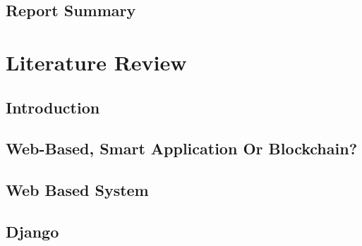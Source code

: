 \documentclass[a4paper,12pt]{book}
\begin{document}
	\section{Report Summary}
		

\chapter{Literature Review}
	\section{Introduction}
		
	\section{Web-Based, Smart Application Or Blockchain?}
		
	\section{Web Based System}
		
	\section{Django}
			
		
	

%
%


\renewcommand{\bibname}{References}

\end{document}
